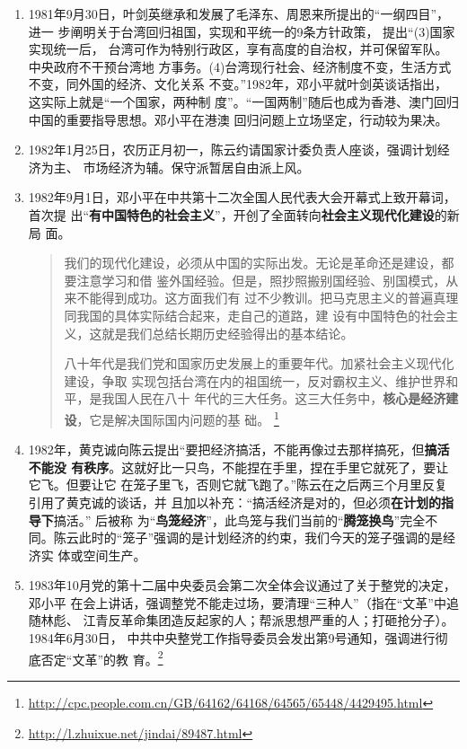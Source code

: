 \begin{enumerate}
\item 1981年9月30日，叶剑英继承和发展了毛泽东、周恩来所提出的“一纲四目”，进一
  步阐明关于台湾回归祖国，实现和平统一的9条方针政策， 提出“(3)国家实现统一后，
  台湾可作为特别行政区，享有高度的自治权，并可保留军队。中央政府不干预台湾地
  方事务。(4)台湾现行社会、经济制度不变，生活方式不变，同外国的经济、文化关系
  不变。”1982年，邓小平就叶剑英谈话指出，这实际上就是“一个国家，两种制
  度”。“一国两制”随后也成为香港、澳门回归中国的重要指导思想。邓小平在港澳
  回归问题上立场坚定，行动较为果决。

\item 1982年1月25日，农历正月初一，陈云约请国家计委负责人座谈，强调计划经济为主、
  市场经济为辅。保守派暂居自由派上风。

\item 1982年9月1日，邓小平在中共第十二次全国人民代表大会开幕式上致开幕词，首次提
  出“\textbf{有中国特色的社会主义}”，开创了全面转向\textbf{社会主义现代化建设}的新局
  面。
  \begin{quotation}
    我们的现代化建设，必须从中国的实际出发。无论是革命还是建设，都要注意学习和借
    鉴外国经验。但是，照抄照搬别国经验、别国模式，从来不能得到成功。这方面我们有
    过不少教训。把马克思主义的普遍真理同我国的具体实际结合起来，走自己的道路，建
    设有中国特色的社会主义，这就是我们总结长期历史经验得出的基本结论。

    八十年代是我们党和国家历史发展上的重要年代。加紧社会主义现代化建设，争取
    实现包括台湾在内的祖国统一，反对霸权主义、维护世界和平，是我国人民在八十
    年代的三大任务。这三大任务中，\textbf{核心是经济建设}，它是解决国际国内问题的基
    础。
    \footnote{\url{http://cpc.people.com.cn/GB/64162/64168/64565/65448/4429495.html}}
  \end{quotation}

\item 1982年，黄克诚向陈云提出“要把经济搞活，不能再像过去那样搞死，但\textbf{搞活不能没
    有秩序}。这就好比一只鸟，不能捏在手里，捏在手里它就死了，要让它飞。但要让它
  在笼子里飞，否则它就飞跑了。”陈云在之后两三个月里反复引用了黄克诚的谈话，并
  且加以补充：“搞活经济是对的，但必须\textbf{在计划的指导下}搞活。” 后被称
  为“\textbf{鸟笼经济}”\cite{chenyunjihua}，此鸟笼与我们当前的“\textbf{腾笼换鸟}”完全不
  同。陈云此时的“笼子”强调的是计划经济的约束，我们今天的笼子强调的是经济实
  体或空间生产。

\item 1983年10月党的第十二届中央委员会第二次全体会议通过了关于整党的决定，邓小平
  在会上讲话，强调整党不能走过场，要清理“三种人”（指在“文革”中追随林彪、
  江青反革命集团造反起家的人；帮派思想严重的人；打砸抢分子）。1984年6月30日，
  中共中央整党工作指导委员会发出第9号通知，强调进行彻底否定“文革”的教
  育。\footnote{\url{http://l.zhuixue.net/jindai/89487.html}}


\end{enumerate}
